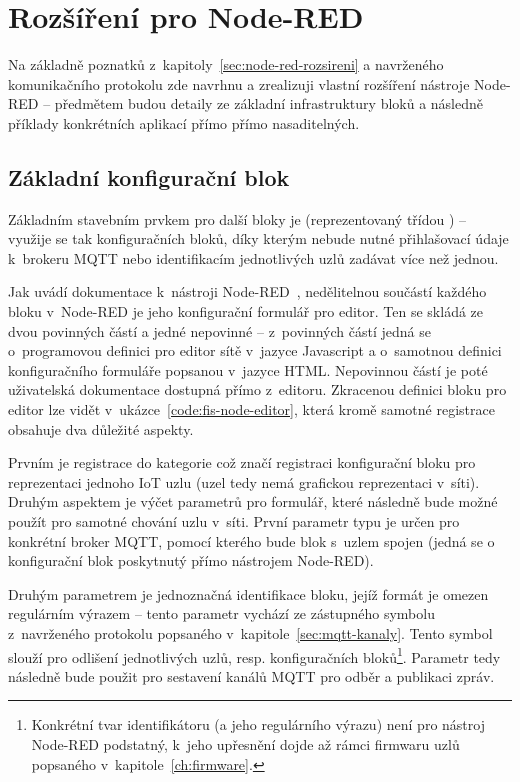 \chapter{Rozšíření pro Node-RED}
\label{ch:rozsireni}

Na základně poznatků z~kapitoly~\ref{sec:node-red-rozsireni} a navrženého komunikačního protokolu zde navrhnu a
zrealizuji vlastní rozšíření nástroje Node-RED -- předmětem budou detaily ze základní infrastruktury bloků a následně
příklady konkrétních aplikací přímo přímo nasaditelných.

\section{Základní konfigurační blok}\label{sec:zakladni-konfiguracni-blok}
Základním stavebním prvkem pro další bloky je  (reprezentovaný třídou \mbox{)} -- využije se
tak
konfiguračních bloků, díky kterým nebude nutné přihlašovací údaje k~brokeru MQTT nebo identifikacím jednotlivých
uzlů zadávat více než jednou.

Jak uvádí dokumentace k~nástroji Node-RED~\cite{NodeRedDocs}, nedělitelnou součástí každého bloku v~Node-RED je jeho
konfigurační formulář pro editor.
Ten se skládá ze dvou povinných částí a jedné nepovinné -- z~povinných částí jedná se o~programovou definici pro editor
sítě v~jazyce Javascript a o~samotnou definici konfiguračního formuláře popsanou v~jazyce HTML.
Nepovinnou částí je poté uživatelská dokumentace dostupná přímo z~editoru.
Zkracenou definici bloku pro editor lze vidět v~ukázce~\ref{code:fis-node-editor}, která kromě samotné registrace
obsahuje dva důležité aspekty.

Prvním je registrace do kategorie  což značí registraci konfigurační bloku pro reprezentaci jednoho IoT
uzlu (uzel tedy nemá grafickou reprezentaci v~síti).
Druhým aspektem je výčet parametrů pro formulář, které následně bude možné použít pro samotné chování uzlu v~síti.
První parametr typu  je určen pro konkrétní broker MQTT, pomocí kterého bude blok s~uzlem spojen
(jedná se o konfigurační blok poskytnutý přímo nástrojem Node-RED).

Druhým parametrem je jednoznačná identifikace bloku, jejíž formát je omezen regulárním výrazem -- tento
parametr vychází ze zástupného symbolu  z~navrženého protokolu popsaného
v~kapitole~\ref{sec:mqtt-kanaly}.
Tento symbol slouží pro odlišení jednotlivých uzlů, resp. konfiguračních bloků\footnote{Konkrétní tvar
identifikátoru (a jeho regulárního výrazu) není pro nástroj Node-RED podstatný, k~jeho upřesnění dojde až rámci
firmwaru uzlů popsaného v~kapitole~\ref{ch:firmware}.}.
Parametr  tedy následně bude použit pro sestavení kanálů MQTT pro odběr a publikaci zpráv.

